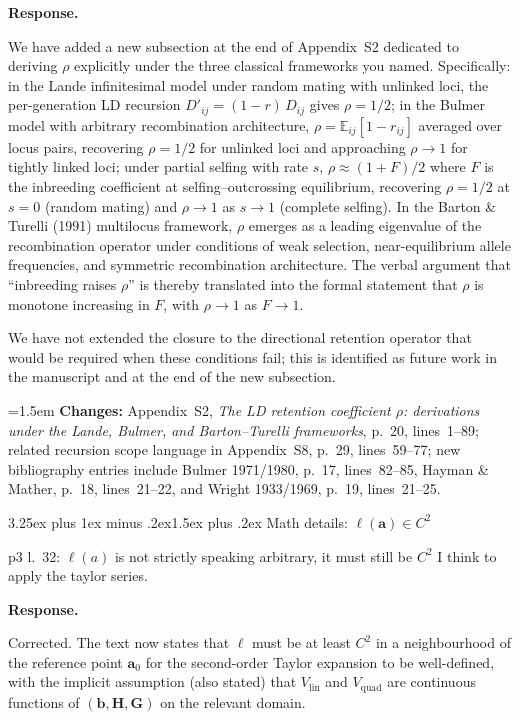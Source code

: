 \documentclass[11pt,a4paper]{article}
\makeatletter
\newcommand{\response}{%
  \par\medskip\noindent\textbf{\color{ResponseColor}Response.}\quad\ignorespaces
}
\newcommand{\changesat}[1]{%
  \par\smallskip\noindent\hangindent=1.5em\hangafter=1
  \textbf{\color{ChangeColor}Changes:} \quad #1\par\medskip
}
\renewcommand{\subsection}{\@startsection{subsection}{2}{0pt}%
  {3.25ex plus 1ex minus .2ex}{1.5ex plus .2ex}%
  {\large\bfseries}}
\newcommand{\Vlin}{\ensuremath{V_{\mathrm{lin}}}\xspace}
\newcommand{\Vquad}{\ensuremath{V_{\mathrm{quad}}}\xspace}
\newcommand{\mat}[1]{\ensuremath{\mathbf{#1}}}
\newcommand{\vect}[1]{\ensuremath{\bm{#1}}}
\makeatother
\begin{document}
\response
We have added a new subsection at the end of Appendix~S2 dedicated to deriving $\rho$ explicitly under the three classical frameworks you named. Specifically: in the Lande infinitesimal model under random mating with unlinked loci, the per-generation LD recursion $D'_{ij} = (1-r)\,D_{ij}$ gives $\rho = 1/2$; in the Bulmer model with arbitrary recombination architecture, $\rho = \mathbb{E}_{ij}[1 - r_{ij}]$ averaged over locus pairs, recovering $\rho = 1/2$ for unlinked loci and approaching $\rho \to 1$ for tightly linked loci; under partial selfing with rate $s$, $\rho \approx (1+F)/2$ where $F$ is the inbreeding coefficient at selfing--outcrossing equilibrium, recovering $\rho = 1/2$ at $s=0$ (random mating) and $\rho \to 1$ as $s \to 1$ (complete selfing). In the Barton \& Turelli (1991) multilocus framework, $\rho$ emerges as a leading eigenvalue of the recombination operator under conditions of weak selection, near-equilibrium allele frequencies, and symmetric recombination architecture. The verbal argument that ``inbreeding raises $\rho$'' is thereby translated into the formal statement that $\rho$ is monotone increasing in $F$, with $\rho \to 1$ as $F \to 1$.

We have not extended the closure to the directional retention operator that would be required when these conditions fail; this is identified as future work in the manuscript and at the end of the new subsection.

\changesat{Appendix~S2, \textit{The LD retention coefficient $\rho$: derivations under the Lande, Bulmer, and Barton--Turelli frameworks}, p.~20, lines~1--89; related recursion scope language in Appendix~S8, p.~29, lines~59--77; new bibliography entries include Bulmer 1971/1980, p.~17, lines~82--85, Hayman \& Mather, p.~18, lines~21--22, and Wright 1933/1969, p.~19, lines~21--25.}

\subsection{\texorpdfstring{Math details: $\ell(\vect{a}) \in C^2$}{Math details: l(a) is C2}}

\begin{edquote}
p3 l.~32: $\ell(a)$ is not strictly speaking arbitrary, it must still be $C^2$ I think to apply the taylor series.
\end{edquote}

\response
Corrected. The text now states that $\ell$ must be at least $C^2$ in a neighbourhood of the reference point $\vect{a}_0$ for the second-order Taylor expansion to be well-defined, with the implicit assumption (also stated) that $\Vlin$ and $\Vquad$ are continuous functions of $(\vect{b}, \mat{H}, \mat{G})$ on the relevant domain.
\end{document}
